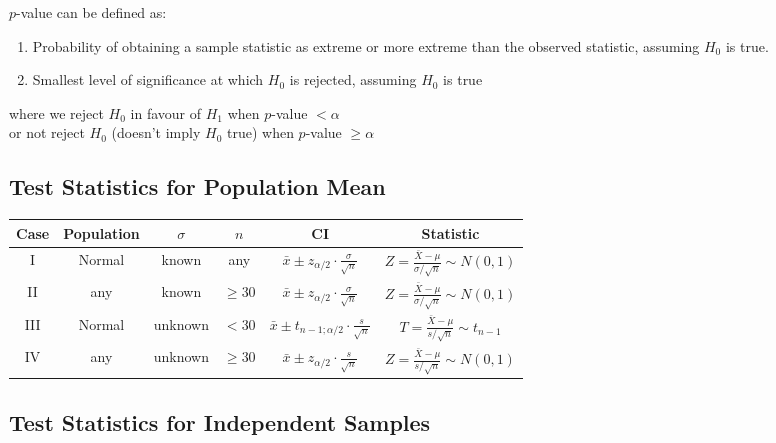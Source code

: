 \documentclass[12pt, a4paper]{article}
\begin{document}
\begin{multicols*}{3}
$p$-value can be defined as:
\begin{enumerate}[\roman*.]
  \item Probability of obtaining a sample statistic as extreme or more extreme than the observed statistic, assuming $H_0$ is true.
  \item Smallest level of significance at which $H_0$ is rejected, assuming $H_0$ is true
\end{enumerate}
where we reject $H_0$ in favour of $H_1$ when $p$-value $< \alpha$\\
or not reject $H_0$ (doesn't imply $H_0$ true) when $p$-value $\geq \alpha$

\colbreak
\subsection*{Test Statistics for Population Mean}

\begin{center}
\renewcommand{\arraystretch}{1.5}
\begin{tabular}{|c|c|c|c|c|c|}
\hline
\textbf{Case} & \textbf{Population} & \( \sigma \) & \( n \) & \textbf{CI} & \textbf{Statistic} \\
\hline
I & Normal & known & any & 
\( \displaystyle\bar{x} \pm z_{\alpha /2} \cdot \frac{\sigma}{\sqrt{n}} \) & 
\(\displaystyle Z = \frac{\bar{X} - \mu}{\sigma / \sqrt{n}} \sim N(0, 1) \) \\
\hline
II & any & known & \( \geq 30 \) & 
\(\displaystyle \bar{x} \pm z_{\alpha /2} \cdot \frac{\sigma}{\sqrt{n}} \) & 
\(\displaystyle Z = \frac{\bar{X} - \mu}{\sigma / \sqrt{n}} \sim N(0, 1) \) \\
\hline
III & Normal & unknown & \( < 30 \) & 
\(\displaystyle \bar{x} \pm t_{n-1; \alpha /2} \cdot \frac{s}{\sqrt{n}} \) & 
\(\displaystyle T = \frac{\bar{X} - \mu}{s / \sqrt{n}} \sim t_{n-1} \) \\
\hline
IV & any & unknown & \( \geq 30 \) & 
\(\displaystyle \bar{x} \pm z_{\alpha /2} \cdot \frac{s}{\sqrt{n}} \) & 
\(\displaystyle Z = \frac{\bar{X} - \mu}{s / \sqrt{n}} \sim N(0, 1) \) \\
\hline
\end{tabular}
\end{center}

\vspace{1em}

\subsection*{Test Statistics for Independent Samples}


\end{multicols*}
\end{document}
